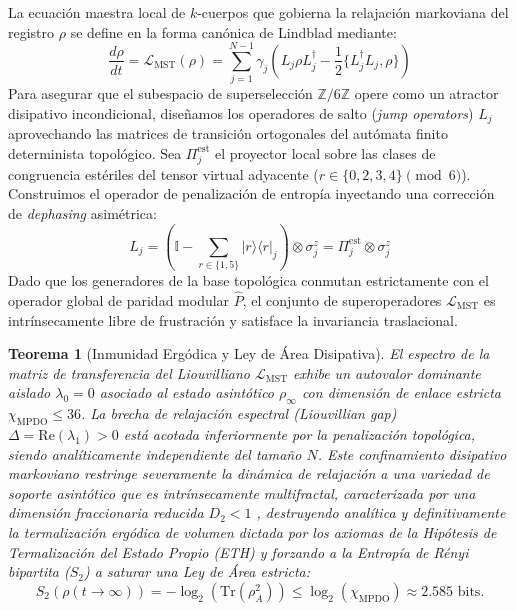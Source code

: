 \documentclass[12pt,a4paper]{article}
\theoremstyle{plain}
\newtheorem{teorema}{Teorema}[section]
\theoremstyle{definition}
\theoremstyle{remark}
\begin{document}
La ecuación maestra local de $k$-cuerpos que gobierna la relajación markoviana del registro $\rho$ se define en la forma canónica de Lindblad \cite{Lindblad1976} mediante:
\begin{equation}
\frac{d\rho}{dt} = \mathcal{L}_{\text{MST}}(\rho) = \sum_{j=1}^{N-1} \gamma_j \left( L_j \rho L_j^\dagger - \frac{1}{2} \{ L_j^\dagger L_j, \rho \} \right)
\label{eq:lindblad_master}
\end{equation}
Para asegurar que el subespacio de superselección $\mathbb{Z}/6\mathbb{Z}$ opere como un atractor disipativo incondicional, diseñamos los operadores de salto (\textit{jump operators}) $L_j$ aprovechando las matrices de transición ortogonales del autómata finito determinista topológico. Sea $\Pi_j^{\text{est}}$ el proyector local sobre las clases de congruencia estériles del tensor virtual adyacente ($r \in \{0,2,3,4\} \pmod 6$). Construimos el operador de penalización de entropía inyectando una corrección de \textit{dephasing} asimétrica:
\begin{equation}
L_j = \left( \mathbb{I} - \sum_{r \in \{1,5\}} |r\rangle\langle r|_j \right) \otimes \sigma_j^z = \Pi_j^{\text{est}} \otimes \sigma_j^z
\label{eq:jump_operators}
\end{equation}
Dado que los generadores de la base topológica conmutan estrictamente con el operador global de paridad modular $\hat{P}$, el conjunto de superoperadores $\mathcal{L}_{\text{MST}}$ es intrínsecamente libre de frustración y satisface la invariancia traslacional.

\begin{teorema}[Inmunidad Ergódica y Ley de Área Disipativa]
\label{teo:parent_lindbladian}
El espectro de la matriz de transferencia del Liouvilliano $\mathcal{L}_{\text{MST}}$ exhibe un autovalor dominante aislado $\lambda_0 = 0$ asociado al estado asintótico $\rho_\infty$ con dimensión de enlace estricta $\chi_{\text{MPDO}} \le 36$. La brecha de relajación espectral (\textit{Liouvillian gap}) $\Delta = \text{Re}(\lambda_1) > 0$ está acotada inferiormente por la penalización topológica, siendo analíticamente independiente del tamaño $N$. Este confinamiento disipativo markoviano restringe severamente la dinámica de relajación a una variedad de soporte asintótico que es intrínsecamente multifractal, caracterizada por una dimensión fraccionaria reducida $D_2 < 1$ \cite{Peinador_Modular_Quantum_Chaos_2026}, destruyendo analítica y definitivamente la termalización ergódica de volumen dictada por los axiomas de la Hipótesis de Termalización del Estado Propio (ETH) y forzando a la Entropía de Rényi bipartita ($S_2$) a saturar una Ley de Área estricta:
\begin{equation}
S_2(\rho(t \to \infty)) = -\log_2(\text{Tr}(\rho_A^2)) \le \log_2(\chi_{\text{MPDO}}) \approx 2.585 \text{ bits}.
\end{equation}
\end{teorema}
\end{document}
